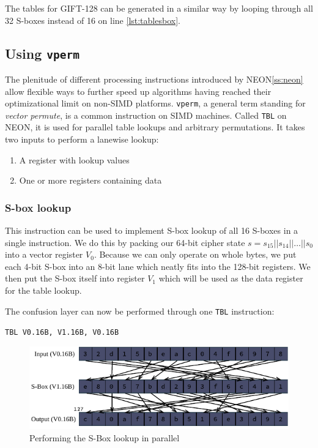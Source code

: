 The tables for GIFT-128 can be generated in a similar way by looping
through all 32 S-boxes instead of 16 on line \ref{lst:tablesbox}.

\subsection{Using \texttt{vperm}}

The plenitude of different processing instructions introduced by
NEON\ref{ss:neon} allow flexible ways to further speed up algorithms having
reached their optimizational limit on non-SIMD platforms. \texttt{vperm}, a
general term standing for \textit{vector permute}, is a common instruction on
SIMD machines. Called \texttt{TBL} on NEON, it is used for parallel table
lookups and arbitrary permutations. It takes two inputs to perform a lanewise
lookup:

\begin{enumerate}
    \item A register with lookup values
    \item One or more registers containing data
\end{enumerate}

\subsubsection{S-box lookup}

This instruction can be used to implement S-box lookup of all 16 S-boxes in a
single instruction. We do this by packing our 64-bit cipher state
$s=s_{15}||s_{14}||\dots||s_0$ into a vector register $V_0$. Because we can
only operate on whole bytes, we put each 4-bit S-box into an 8-bit lane which
neatly fits into the 128-bit registers. We then put the S-box itself into
register $V_1$ which will be used as the data register for the table lookup.

The confusion layer can now be performed through one \texttt{TBL} instruction:

\begin{center}
    \texttt{TBL V0.16B, V1.16B, V0.16B}
\end{center}

\begin{figure}[h!]
    \centering
    \includegraphics[width=\textwidth]{Figures/tbl_example.pdf}
    \caption{Performing the S-Box lookup in parallel}
\end{figure}

